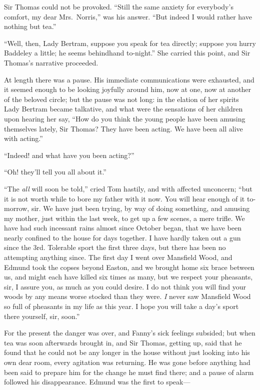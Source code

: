 \documentclass{article}
\begin{document}
Sir Thomas could not be provoked.  ``Still the same
anxiety for everybody's comfort, my dear Mrs.\ Norris,''
was his answer.  ``But indeed I would rather have nothing
but tea.''

``Well, then, Lady Bertram, suppose you speak for
tea directly; suppose you hurry Baddeley a little;
he seems behindhand to-night.'' She carried this point,
and Sir Thomas's narrative proceeded.

At length there was a pause.  His immediate communications
were exhausted, and it seemed enough to be looking joyfully
around him, now at one, now at another of the beloved circle;
but the pause was not long:  in the elation of her
spirits Lady Bertram became talkative, and what were
the sensations of her children upon hearing her say,
``How do you think the young people have been amusing
themselves lately, Sir Thomas?  They have been acting.
We have been all alive with acting.''

``Indeed! and what have you been acting?''

``Oh! they'll tell you all about it.''

``The \emph{all} will soon be told,'' cried Tom hastily,
and with affected unconcern; ``but it is not worth
while to bore my father with it now.  You will hear
enough of it to-morrow, sir.  We have just been trying,
by way of doing something, and amusing my mother,
just within the last week, to get up a few scenes,
a mere trifle.  We have had such incessant rains almost
since October began, that we have been nearly confined
to the house for days together.  I have hardly taken out
a gun since the 3rd.  Tolerable sport the first three days,
but there has been no attempting anything since.
The first day I went over Mansfield Wood, and Edmund took
the copses beyond Easton, and we brought home six brace
between us, and might each have killed six times as many,
but we respect your pheasants, sir, I assure you,
as much as you could desire.  I do not think you will find
your woods by any means worse stocked than they were.
\emph{I} never saw Mansfield Wood so full of pheasants in my
life as this year.  I hope you will take a day's sport
there yourself, sir, soon.''

For the present the danger was over, and Fanny's sick
feelings subsided; but when tea was soon afterwards
brought in, and Sir Thomas, getting up, said that he found
that he could not be any longer in the house without
just looking into his own dear room, every agitation
was returning.  He was gone before anything had been
said to prepare him for the change he must find there;
and a pause of alarm followed his disappearance.
Edmund was the first to speak---%
\end{document}
